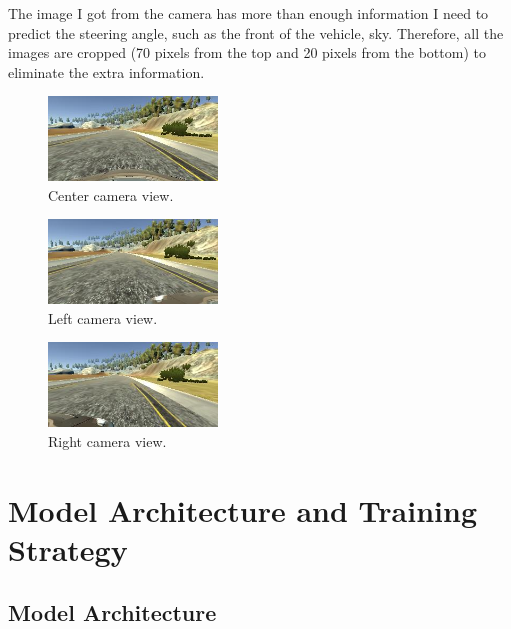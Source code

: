 \documentclass{article}
\begin{document}
The image I got from the camera has more than enough information I need to predict the steering angle, such as the front of the vehicle, sky. Therefore, all the images are cropped (70 pixels from the top and 20 pixels from the bottom) to eliminate the extra information. 


\begin{figure}[!ht]
\centering
\includegraphics[width=0.4\textwidth]{center.JPG}
\caption{Center camera view.}
\label{fig: center}
\end{figure}
\begin{figure}[!ht]
\centering
\includegraphics[width=0.4\textwidth]{left.JPG}
\caption{Left camera view.}
\label{fig: left}
\end{figure}
\begin{figure}[H]
\centering
\includegraphics[width=0.4\textwidth]{right.JPG}
\caption{Right camera view.}
\label{fig: right}
\end{figure}

\section{Model Architecture and Training Strategy}
\subsection{Model Architecture}
\end{document}
